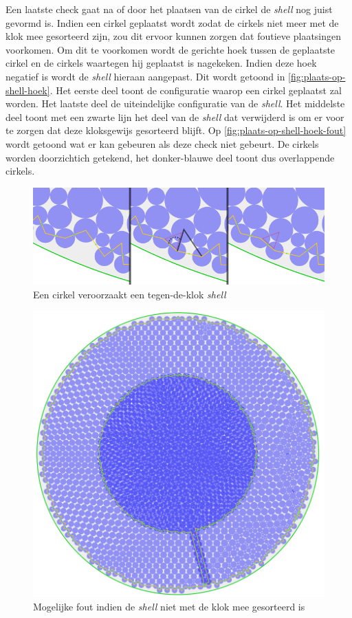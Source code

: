 \documentclass[12pt,a4paper,oneside]{book}
\begin{document}
Een laatste check gaat na of door het plaatsen van de cirkel de \textit{shell} nog juist gevormd is.
Indien een cirkel geplaatst wordt zodat de cirkels niet meer met de klok mee gesorteerd zijn, zou dit ervoor kunnen zorgen dat foutieve plaatsingen voorkomen.
Om dit te voorkomen wordt de gerichte hoek tussen de geplaatste cirkel en de cirkels waartegen hij geplaatst is nagekeken.
Indien deze hoek negatief is wordt de \textit{shell} hieraan aangepast.
Dit wordt getoond in \autoref{fig:plaats-op-shell-hoek}.
Het eerste deel toont de configuratie waarop een cirkel geplaatst zal worden.
Het laatste deel de uiteindelijke configuratie van de \textit{shell}.
Het middelste deel toont met een zwarte lijn het deel van de \textit{shell} dat verwijderd is om er voor te zorgen dat deze kloksgewijs gesorteerd blijft.
Op \autoref{fig:plaats-op-shell-hoek-fout}  wordt getoond wat er kan gebeuren als deze check niet gebeurt.
De cirkels worden doorzichtich getekend, het donker-blauwe deel toont dus overlappende cirkels.

\begin{figure}
  \centering
  \includegraphics[width=1.0\textwidth]{plaats-op-shell-hoek.png}
  \caption{Een cirkel veroorzaakt een tegen-de-klok \textit{shell}} \label{fig:plaats-op-shell-hoek} 
\end{figure}

\begin{figure}
  \centering
  \includegraphics[width=.65\textwidth]{plaats-op-shell-hoek-fout.png}
  \caption{Mogelijke fout indien de \textit{shell} niet met de klok mee gesorteerd is} \label{fig:plaats-op-shell-hoek-fout} 
\end{figure}
\end{document}
